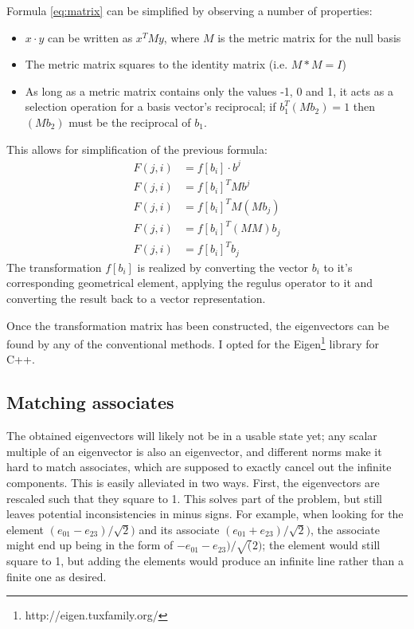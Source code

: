 \documentclass[a4paper, 10pt]{article}
\begin{document}
Formula \ref{eq:matrix} can be simplified by observing a number of properties:
\begin{itemize}
  \item $x \cdot y$ can be written as $x^T M y$, where $M$ is the metric matrix
    for the null basis
  \item The metric matrix squares to the identity matrix (i.e. $M * M = I$)
  \item As long as a metric matrix contains only the values -1, 0 and 1, it acts
    as a selection operation for a basis vector's reciprocal; if $b_{1}^{T} (M b_{2}) = 1$
    then $(M b_{2})$ must be the reciprocal of $b_{1}$.
\end{itemize}
This allows for simplification of the previous formula:
\begin{align*}
  F(j, i) &= f[b_i] \cdot b^j \\
  F(j, i) &= f[b_i]^T M b^j \\
  F(j, i) &= f[b_i]^T M (M b_j) \\
  F(j, i) &= f[b_i]^T (M M) b_j \\
  F(j, i) &= f[b_i]^T b_j
\end{align*}
The transformation $f[b_i]$ is realized by converting the vector $b_i$ to it's
corresponding geometrical element, applying the regulus operator to it and
converting the result back to a vector representation.

Once the transformation matrix has been constructed, the eigenvectors can be
found by any of the conventional methods. I opted for the
Eigen\footnote{http://eigen.tuxfamily.org/} library for C++.

\subsection{Matching associates}
The obtained eigenvectors will likely not be in a usable state yet; any scalar
multiple of an eigenvector is also an eigenvector, and different norms make it
hard to match associates, which are supposed to exactly cancel out the infinite
components. This is easily alleviated in two ways. First, the eigenvectors are
rescaled such that they square to 1. This solves part of the problem, but still
leaves potential inconsistencies in minus signs. For example, when looking for
the element $(e_{01} - e_{23}) / \sqrt{2})$ and its associate $(e_{01} + e_{23})
/ \sqrt{2})$, the associate might end up being in the form of $-e_{01} - e_{23})
/ \sqrt(2)$; the element would still square to 1, but adding the elements would
produce an infinite line rather than a finite one as desired.
\end{document}
